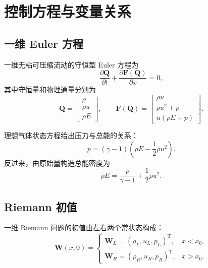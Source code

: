 \section{控制方程与变量关系}

\subsection{一维 Euler 方程}

一维无粘可压缩流动的守恒型 Euler 方程为
\begin{equation}
    \frac{\partial \bm Q}{\partial t}
    +
    \frac{\partial \bm F(\bm Q)}{\partial x}
    =0,
\end{equation}
其中守恒量和物理通量分别为
\begin{equation}
    \bm Q=
    \begin{bmatrix}
        \rho\\
        \rho u\\
        \rho E
    \end{bmatrix},
    \qquad
    \bm F(\bm Q)=
    \begin{bmatrix}
        \rho u\\
        \rho u^2+p\\
        u(\rho E+p)
    \end{bmatrix}.
\end{equation}

理想气体状态方程给出压力与总能的关系：
\begin{equation}
    p=(\gamma-1)
    \left(
        \rho E-\frac{1}{2}\rho u^2
    \right).
\end{equation}
反过来，由原始量构造总能密度为
\begin{equation}
    \rho E
    =
    \frac{p}{\gamma-1}
    +
    \frac{1}{2}\rho u^2.
\end{equation}

\subsection{Riemann 初值}

一维 Riemann 问题的初值由左右两个常状态构成：
\begin{equation}
    \bm W(x,0)=
    \begin{cases}
        \bm W_L=(\rho_L,u_L,p_L)^{\mathrm T}, & x<x_0,\\
        \bm W_R=(\rho_R,u_R,p_R)^{\mathrm T}, & x>x_0.
    \end{cases}
\end{equation}

